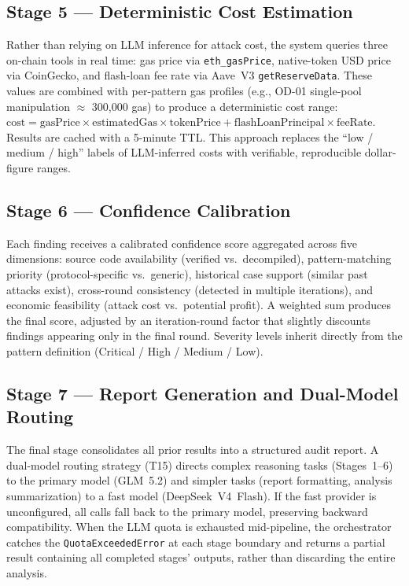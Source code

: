 \documentclass[10pt]{article}
\begin{document}
\subsection{Stage 5 --- Deterministic Cost Estimation}
Rather than relying on LLM inference for attack cost, the system queries three on-chain tools in real time: gas price via \texttt{eth\_gasPrice}, native-token USD price via CoinGecko, and flash-loan fee rate via Aave~V3 \texttt{getReserveData}. These values are combined with per-pattern gas profiles (e.g., OD-01 single-pool manipulation $\approx$ 300{,}000 gas) to produce a deterministic cost range: $\text{cost} = \text{gasPrice} \times \text{estimatedGas} \times \text{tokenPrice} + \text{flashLoanPrincipal} \times \text{feeRate}$. Results are cached with a 5-minute TTL. This approach replaces the ``low / medium / high'' labels of LLM-inferred costs with verifiable, reproducible dollar-figure ranges.

\subsection{Stage 6 --- Confidence Calibration}
Each finding receives a calibrated confidence score aggregated across five dimensions: source code availability (verified vs.\ decompiled), pattern-matching priority (protocol-specific vs.\ generic), historical case support (similar past attacks exist), cross-round consistency (detected in multiple iterations), and economic feasibility (attack cost vs.\ potential profit). A weighted sum produces the final score, adjusted by an iteration-round factor that slightly discounts findings appearing only in the final round. Severity levels inherit directly from the pattern definition (Critical / High / Medium / Low).

\subsection{Stage 7 --- Report Generation and Dual-Model Routing}
The final stage consolidates all prior results into a structured audit report. A dual-model routing strategy (T15) directs complex reasoning tasks (Stages~1--6) to the primary model (GLM~5.2) and simpler tasks (report formatting, analysis summarization) to a fast model (DeepSeek~V4~Flash). If the fast provider is unconfigured, all calls fall back to the primary model, preserving backward compatibility. When the LLM quota is exhausted mid-pipeline, the orchestrator catches the \texttt{QuotaExceededError} at each stage boundary and returns a partial result containing all completed stages' outputs, rather than discarding the entire analysis.
\end{document}

